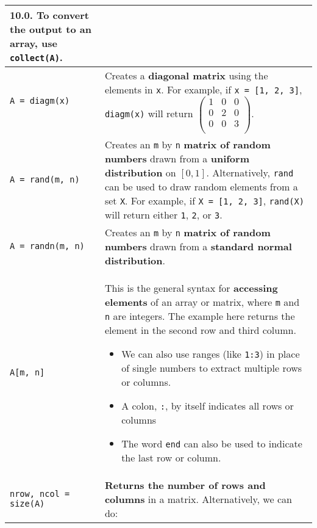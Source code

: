 \documentclass[]{article}
\begin{document}
\begin{longtable}{ |m{6cm}  | m{11cm} |}
{    10.0}. To convert the 
    output to an array, use \texttt{collect(A)}.	
    \\\hline
\begin{verbatim}
A = diagm(x)
\end{verbatim}
& Creates a \textbf{diagonal matrix} using the elements in \texttt{x}.  For example, if
\texttt{x = [1, 2, 3]}, \texttt{diagm(x)} will return
$\begin{pmatrix}
1 & 0 & 0\\
0 & 2 & 0\\
0 & 0 & 3\\
\end{pmatrix}$.
\\\hline
\begin{verbatim}
A = rand(m, n)
\end{verbatim}
& Creates an \texttt{m} by \texttt{n} \textbf{matrix of random numbers} drawn from a
\textbf{uniform distribution} on $[0, 1]$. Alternatively, \texttt{rand} can be used to
draw random elements from a set \texttt{X}. For example, if \texttt{X = [1, 2,
3]}, \texttt{rand(X)} will return either \texttt{1}, \texttt{2}, or \texttt{3}.
\\\hline
\begin{verbatim}
A = randn(m, n)
\end{verbatim}
& Creates an \texttt{m} by \texttt{n} \textbf{matrix of random numbers} drawn from a
\textbf{standard normal distribution}.\\\hline
\begin{verbatim}
A[m, n]
\end{verbatim}
	& This is the general syntax for \textbf{accessing elements} of an array or matrix, where \texttt{m} and \texttt{n} are integers. The example here returns the element in the second row and third column. 
	\begin{itemize}
	\item We can also use ranges (like \texttt{1:3}) in place of single numbers to extract multiple rows or columns. 
	\item A colon, \texttt{:}, by itself indicates all rows or columns
	\item The word \texttt{end} can also be used to indicate the last row or column.
	\end{itemize}
	\\\hline
\begin{verbatim}
nrow, ncol = size(A)
\end{verbatim}
	& \textbf{Returns the number of rows and columns} in a matrix. Alternatively, we can do:

\end{longtable}
\end{document}
